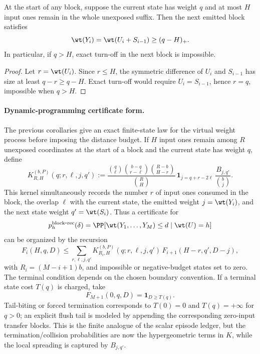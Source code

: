\begin{corollary}
\label{cor:block-recursive-heavy-state-charge}
At the start of any block, suppose the current state has weight \(q\) and at most \(H\) input ones remain in the whole
unexposed suffix.  Then the next emitted block satisfies
\[
\wt(Y_i)=\wt(U_i+S_{i-1})\ge (q-H)_+.
\]
In particular, if \(q>H\), exact turn-off in the next block is impossible.
\end{corollary}

\begin{proof}
Let \(r=\wt(U_i)\).  Since \(r\le H\), the symmetric difference of \(U_i\) and \(S_{i-1}\) has size at least
\(q-r\ge q-H\).  Exact turn-off would require \(U_i=S_{i-1}\), hence \(r=q\), impossible when \(q>H\).
\end{proof}

\paragraph{Dynamic-programming certificate form.}
The previous corollaries give an exact finite-state law for the virtual weight process before imposing the distance
budget.  If \(H\) input ones remain among \(R\) unexposed coordinates at the start of a block and the current state has
weight \(q\), define
\[
K_{R,H}^{(b,P)}(q;r,\ell,j,q')
:=
\frac{\binom{q}{\ell}\binom{b-q}{r-\ell}\binom{R-b}{H-r}}{\binom{R}{H}}\,
\mathbf{1}_{j=q+r-2\ell}\,
\frac{B_{j,q'}}{\binom{b}{j}}.
\]
This kernel simultaneously records the number \(r\) of input ones consumed in the block, the overlap \(\ell\) with the
current state, the emitted weight \(j=\wt(Y_i)\), and the next state weight \(q'=\wt(S_i)\).  Thus a certificate for
\[
p_h^{\mathrm{block\mbox{-}rec}}(\delta)
=
\PP[\wt(Y_1,\ldots,Y_M)\le d\mid \wt(U)=h]
\]
can be organized by the recursion
\[
F_i(H,q,D)
\le
\sum_{r,\ell,j,q'}
K_{R_i,H}^{(b,P)}(q;r,\ell,j,q')\,
F_{i+1}(H-r,q',D-j),
\]
with \(R_i=(M-i+1)b\), and impossible or negative-budget states set to zero.  The terminal condition depends on the
chosen boundary convention.  If a terminal state cost \(T(q)\) is charged, take
\[
F_{M+1}(0,q,D)=\mathbf{1}_{D\ge T(q)}.
\]
Tail-biting or forced termination corresponds to \(T(0)=0\) and \(T(q)=+\infty\) for \(q>0\); an explicit flush tail is
modeled by appending the corresponding zero-input transfer blocks.  This is the finite analogue of the scalar episode
ledger, but the termination/collision probabilities are now the hypergeometric terms in \(K\), while the local
spreading is captured by \(B_{j,q'}\).

